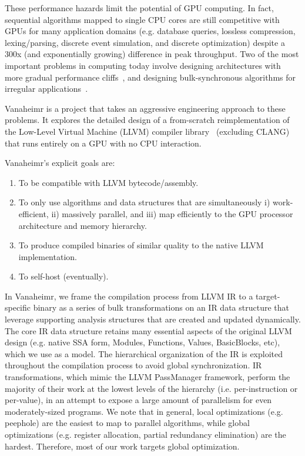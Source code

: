 \documentclass[conference, 10pt]{IEEEtran}
\begin{document}
These performance hazards limit the potential of GPU computing. In fact,
sequential algorithms mapped to single CPU cores are still competitive with GPUs
for many application domains (e.g. database queries, lossless compression,
lexing/parsing, discrete event simulation, and discrete optimization) despite a
300x (and exponentially growing) difference in peak throughput.  Two of the most
important problems in computing today involve designing architectures with more
gradual performance cliffs~\cite{ref:echelon}, and designing bulk-synchronous algorithms for irregular
applications~\cite{ref:irregular-applications}.  

Vanaheimr is a project that takes an aggressive engineering approach to these
problems. It explores the detailed design of a from-scratch reimplementation of
the Low-Level Virtual Machine (LLVM) compiler library~\cite{ref:llvm}
(excluding CLANG) that runs entirely on a GPU with no CPU interaction.  

Vanaheimr's explicit goals are: 

\begin{enumerate}
	\item To be compatible with LLVM bytecode/assembly.
	\item To only use algorithms and data structures that are simultaneously
	      i) work-efficient, ii) massively parallel, and iii) map efficiently to
	      the GPU processor architecture and memory hierarchy.
	\item To produce compiled binaries of similar quality to the native LLVM
	      implementation.
	\item To self-host (eventually).
\end{enumerate}

In Vanaheimr, we frame the compilation process from LLVM IR to a
target-specific binary as a series of bulk transformations on an IR data
structure that leverage supporting analysis structures that are created and
updated dynamically.  The core IR data structure retains many essential aspects
of the original LLVM design (e.g. native SSA form, Modules, Functions, Values,
BasicBlocks, etc), which we use as a model.  The hierarchical organization of
the IR is exploited throughout the compilation process to avoid global
synchronization.  IR transformations, which mimic the LLVM PassManager
framework, perform the majority
of their work at the lowest levels of the hierarchy (i.e. per-instruction or
per-value), in an attempt to expose a large amount of parallelism for even
moderately-sized programs.  We note that in general, local optimizations
(e.g. peephole) are the easiest to map to parallel algorithms, while
global optimizations (e.g. register allocation, partial redundancy elimination)
are the hardest.  Therefore, most of our work targets global optimization.
\end{document}
